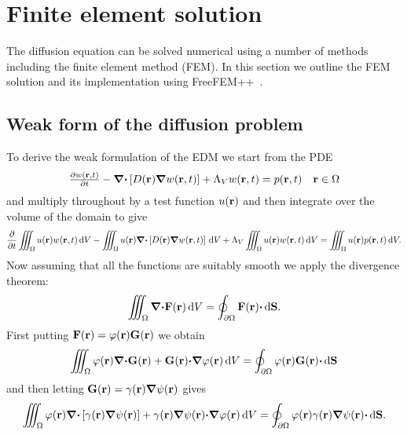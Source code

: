 \documentclass[a4paper]{article}
\numberwithin{equation}{section}
\providecommand\oiint{\oint}
\begin{document}
\section[Finite element solution]{Finite element solution}
\label{sc:fem}

The diffusion equation can be solved numerical using a number of methods
including the finite element method (FEM). In this section we outline the FEM 
solution and its implementation using FreeFEM++~\citep{Hecht2013,Hecht2017}.

\subsection[Weak form of the diffusion problem]{Weak form of the diffusion problem}
\label{sc:fem:weak}

To derive the weak formulation of the EDM we start from the PDE
\begin{align}
\begin{matrix}
\frac{{\partial}w(\boldsymbol{\mathrm{r}},t)}{{\partial}t}-{\boldsymbol{\mathrm{\nabla}}}{\boldsymbol{\mathrm{\cdot}}}\left[D(\boldsymbol{\mathrm{r}}){\boldsymbol{\mathrm{\nabla}}}w(\boldsymbol{\mathrm{r}},t)\right]+\Lambda_V w(\boldsymbol{\mathrm{r}},t)=p(\boldsymbol{\mathrm{r}},t) &\boldsymbol{\mathrm{r}}\in\Omega 
\end{matrix}
\end{align}
and multiply throughout by a test function $u(\boldsymbol{\mathrm{r}})$ and then integrate over the volume of the domain to give 
\begin{align}
\frac{{\partial}}{{\partial}t}\iiint_{\Omega} u(\boldsymbol{\mathrm{r}}) w(\boldsymbol{\mathrm{r}},t)\,\mathrm{d}{V}
-\iiint_{\Omega} u(\boldsymbol{\mathrm{r}}){\boldsymbol{\mathrm{\nabla}}}{\boldsymbol{\mathrm{\cdot}}}\left[D(\boldsymbol{\mathrm{r}}){\boldsymbol{\mathrm{\nabla}}}w(\boldsymbol{\mathrm{r}},t)\right]\,\mathrm{d}{V}
+\Lambda_V \iiint_{\Omega } u(\boldsymbol{\mathrm{r}}) w(\boldsymbol{\mathrm{r}},t)\,\mathrm{d}{V}
=\iiint_{\Omega} u(\boldsymbol{\mathrm{r}}) p(\boldsymbol{\mathrm{r}},t)\,\mathrm{d}{V}.
\end{align}
Now assuming that all the functions are suitably smooth we apply the divergence
theorem: 
\begin{align}
\iiint_{\Omega} {\vnabla}{\vcdot}\vF\pr\dif{V} = \oiint_{\partial\Omega}\vF\pr{\vcdot}\dif{\vS}.
\end{align}
First putting $\boldsymbol{\mathrm{F}}(\boldsymbol{\mathrm{r}})=\varphi(\boldsymbol{\mathrm{r}})\boldsymbol{\mathrm{G}}(\boldsymbol{\mathrm{r}})$ we obtain
\begin{align}
\iiint_{\Omega} \varphi\pr{\vnabla}{\vcdot}\vG\pr+\vG\pr{\vcdot}{\vnabla}\varphi\pr\dif{V}
=\oiint_{\partial\Omega } \varphi\pr\vG\pr{\vcdot}\dif{\vS}
\end{align}
and then letting $\boldsymbol{\mathrm{G}}(\boldsymbol{\mathrm{r}})=\gamma(\boldsymbol{\mathrm{r}}){\boldsymbol{\mathrm{\nabla}}}\psi(\boldsymbol{\mathrm{r}})$ gives
\begin{align}
\iiint_{\Omega} \varphi\pr{\vnabla}{\vcdot}\left[\gamma\pr{\vnabla}\psi\pr\right]+\gamma\pr{\vnabla}\psi\pr{\vcdot}{\vnabla}\varphi\pr\dif{V}
=\oiint_{\partial\Omega }\varphi\pr\gamma\pr{\vnabla}\psi\pr{\vcdot}\dif{\vS}.
\end{align}
\end{document}

